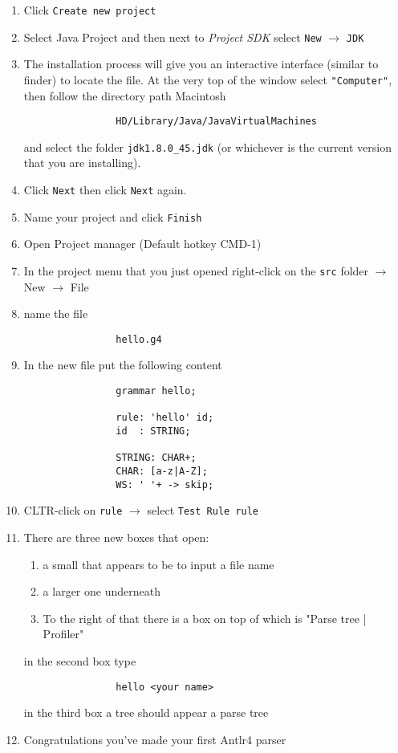 \documentclass{article}
\begin{document}
		\begin{enumerate}
			\item Click \texttt{Create new project}
			\item Select Java Project and then next to \textit{Project SDK} select \texttt{New} $\rightarrow$ \texttt{JDK}
			\item The installation process will give you an interactive interface (similar to finder) to locate the
			file. At the very top of the window select \texttt{"Computer"}, then follow the directory path Macintosh
			\begin{lstlisting}
				HD/Library/Java/JavaVirtualMachines
			\end{lstlisting}
			and select the folder \texttt{jdk1.8.0\_45.jdk} (or whichever is the current version that you are
			installing).
			\item Click \texttt{Next} then click \texttt{Next} again.
			\item Name your project and click \texttt{Finish}
			\item Open Project manager (Default hotkey CMD-1)
			\item In the project menu that you just opened right-click on the \texttt{src} folder $\rightarrow$ New $\rightarrow$ File
			\item name the file
			\begin{lstlisting}
				hello.g4
			\end{lstlisting}
			\item In the new file put the following content
			\begin{lstlisting}
				grammar hello;

				rule: 'hello' id;
				id  : STRING;

				STRING: CHAR+;
				CHAR: [a-z|A-Z];
				WS: ' '+ -> skip;
			\end{lstlisting}
			\item CLTR-click on \texttt{rule} $\rightarrow$ select \texttt{Test Rule rule}
			\item There are three new boxes that open:
			\begin{enumerate}
				\item a small that appears to be to input a file name
				\item a larger one underneath
				\item To the right of that there is a box on top of which is "Parse tree | Profiler"
			\end{enumerate}
			in the second box type
			\begin{lstlisting}
				hello <your name>
			\end{lstlisting}
			in the third box a tree should appear a parse tree
			\item Congratulations you've made your first Antlr4 parser

		\end{enumerate}
\end{document}
